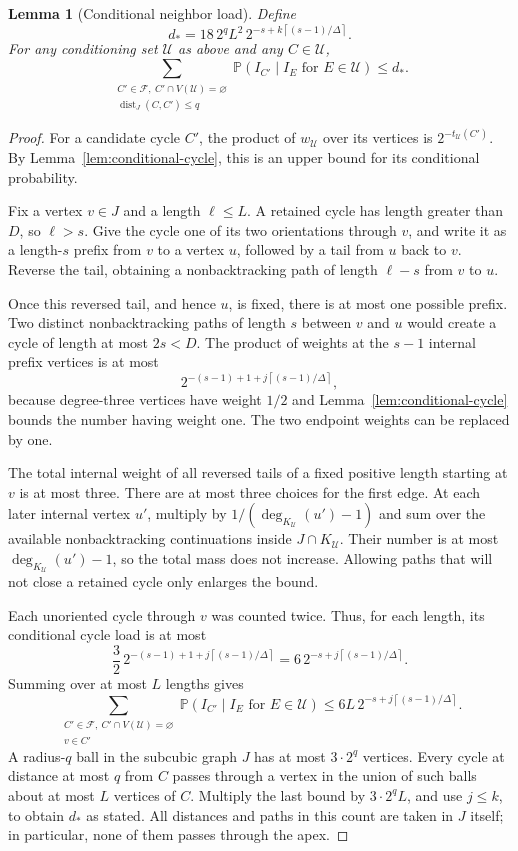 \documentclass[11pt,a4paper]{article}
\numberwithin{equation}{section}
\newtheorem{lemma}[theorem]{Lemma}
\theoremstyle{definition}
\theoremstyle{remark}
\newcommand{\Prob}{\mathbb P}
\newcommand{\dist}{\operatorname{dist}}
\newcommand{\ceil}[1]{\left\lceil#1\right\rceil}
\begin{document}
\begin{lemma}[Conditional neighbor load]\label{lem:load}
Define
\begin{equation}\label{eq:dstar}
 d_*=18\,2^qL^2\,2^{-s+k\ceil{(s-1)/\Delta}}.
\end{equation}
For any conditioning set $\mathcal U$ as above and any $C\in\mathcal U$,
\[
 \sum_{\substack{C'\in\mathcal F,\ C'\cap V(\mathcal U)=\varnothing\\
                        \dist_J(C,C')\le q}}
 \Prob(I_{C'}\mid I_E\text{ for }E\in\mathcal U)\le d_*.
\]
\end{lemma}
\begin{proof}
For a candidate cycle $C'$, the product of $w_{\mathcal U}$ over its vertices is $2^{-t_{\mathcal U}(C')}$. By Lemma~\ref{lem:conditional-cycle}, this is an upper bound for its conditional probability.

Fix a vertex $v\in J$ and a length $\ell\le L$. A retained cycle has length greater than $D$, so $\ell>s$. Give the cycle one of its two orientations through $v$, and write it as a length-$s$ prefix from $v$ to a vertex $u$, followed by a tail from $u$ back to $v$. Reverse the tail, obtaining a nonbacktracking path of length $\ell-s$ from $v$ to $u$.

Once this reversed tail, and hence $u$, is fixed, there is at most one possible prefix. Two distinct nonbacktracking paths of length $s$ between $v$ and $u$ would create a cycle of length at most $2s<D$. The product of weights at the $s-1$ internal prefix vertices is at most
\[
 2^{-(s-1)+1+j\ceil{(s-1)/\Delta}},
\]
because degree-three vertices have weight $1/2$ and Lemma~\ref{lem:conditional-cycle} bounds the number having weight one. The two endpoint weights can be replaced by one.

The total internal weight of all reversed tails of a fixed positive length starting at $v$ is at most three. There are at most three choices for the first edge. At each later internal vertex $u'$, multiply by $1/(\deg_{K_{\mathcal U}}(u')-1)$ and sum over the available nonbacktracking continuations inside $J\cap K_{\mathcal U}$. Their number is at most $\deg_{K_{\mathcal U}}(u')-1$, so the total mass does not increase. Allowing paths that will not close a retained cycle only enlarges the bound.

Each unoriented cycle through $v$ was counted twice. Thus, for each length, its conditional cycle load is at most
\[
 \frac32\,2^{-(s-1)+1+j\ceil{(s-1)/\Delta}}
   =6\,2^{-s+j\ceil{(s-1)/\Delta}}.
\]
Summing over at most $L$ lengths gives
\[
 \sum_{\substack{C'\in\mathcal F,\ C'\cap V(\mathcal U)=\varnothing\\v\in C'}}
 \Prob(I_{C'}\mid I_E\text{ for }E\in\mathcal U)
 \le6L\,2^{-s+j\ceil{(s-1)/\Delta}}.
\]
A radius-$q$ ball in the subcubic graph $J$ has at most $3\cdot2^q$ vertices. Every cycle at distance at most $q$ from $C$ passes through a vertex in the union of such balls about at most $L$ vertices of $C$. Multiply the last bound by $3\cdot2^q L$, and use $j\le k$, to obtain $d_*$ as stated. All distances and paths in this count are taken in $J$ itself; in particular, none of them passes through the apex.
\end{proof}
\end{document}

